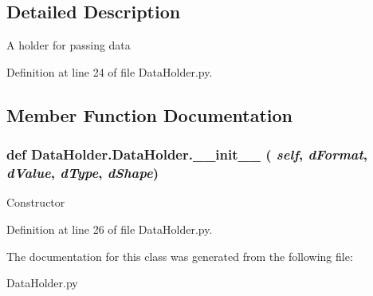\subsection{Detailed Description}
\begin{DoxyVerb}A holder for passing data \end{DoxyVerb}
 

Definition at line 24 of file DataHolder.py.

\subsection{Member Function Documentation}
\hypertarget{classDataHolder_1_1DataHolder_a64f447d8ccac8ace2848733b9fb271fb}{
\subsubsection[{\_\-\_\-init\_\-\_\-}]{\setlength{\rightskip}{0pt plus 5cm}def DataHolder.DataHolder.\_\-\_\-init\_\-\_\- ( {\em self}, \/   {\em dFormat}, \/   {\em dValue}, \/   {\em dType}, \/   {\em dShape})}}
\label{classDataHolder_1_1DataHolder_a64f447d8ccac8ace2848733b9fb271fb}
\begin{DoxyVerb}Constructor \end{DoxyVerb}
 

Definition at line 26 of file DataHolder.py.

The documentation for this class was generated from the following file:\begin{DoxyCompactItemize}
\item 
DataHolder.py\end{DoxyCompactItemize}
